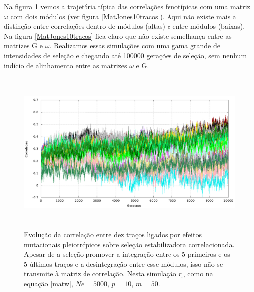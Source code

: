 Na figura \ref{jones10tracos} vemos a trajetória típica das correlações
fenotípicas com uma matriz $\omega$ com dois módulos (ver figura
\ref{MatJones10tracos}).  Aqui não existe mais a distinção entre
correlações dentro de módulos (altas) e entre módulos (baixas). Na figura
\ref{MatJones10tracos} fica claro que não existe semelhança entre as
matrizes G e $\omega$. Realizamos essas simulações com uma gama grande
de intensidades de seleção e chegando até 100000 gerações de seleção,
sem nenhum indício de alinhamento entre as matrizes $\omega$ e G.  

\begin{center}
\begin{figure}[htbp]
  \includegraphics[width=150mm, height=80mm]{figuras/jones10tracos.png}
  \caption{Evolução da correlação entre dez traços ligados por efeitos
  mutacionais pleiotrópicos sobre seleção estabilizadora correlacionada.
  Apesar de a seleção promover a integração entre os 5 primeiros e os 5
  últimos traços e a desintegração entre esse módulos, isso não se
  transmite à matriz de correlação. Nesta simulação
    $r_\omega$ como na equação \ref{matw}, $Ne=5000$, $p=10$, $m=50$.}
  \label{jones10tracos}
\end{figure}
\end{center}

